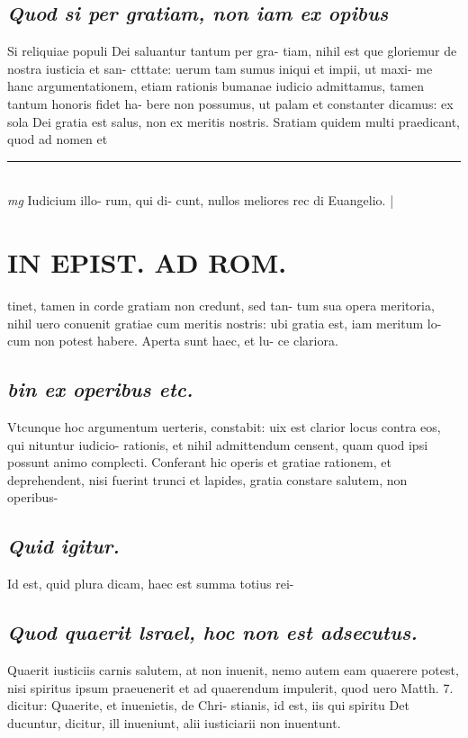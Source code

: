 \documentclass{article}
\begin{document}
\begin{pages}
\subsection*{\textit{Quod si per gratiam, non iam ex opibus }}\pstart Si reliquiae populi Dei saluantur tantum per gra- tiam, nihil est que gloriemur de nostra iusticia et san- ctttate: uerum tam sumus iniqui et impii, ut maxi- me hanc argumentationem, etiam rationis bumanae iudicio admittamus, tamen tantum honoris fidet ha- bere non possumus, ut palam et constanter dicamus: ex sola Dei gratia est salus, non ex meritis nostris. Sratiam quidem multi praedicant, quod ad nomen et  \pend
\vspace{0.5cm}\noindent
\vspace{0.2cm}\rule{1cm}{0.2pt}\\ 
\hspace{0.2cm}\textit{mg}
\footnotesize Iudicium illo- rum, qui di- cunt, nullos meliores rec di Euangelio. 
\normalsize| 
\section*{IN EPIST. AD ROM.  }
\marginpar{[ p.125 ]}\pstart tinet, tamen in corde gratiam non credunt, sed tan- tum sua opera meritoria, nihil uero conuenit gratiae cum meritis nostris: ubi gratia est, iam meritum lo- cum non potest habere. Aperta sunt haec, et lu- ce clariora.   \pend
{}
{}
\subsection*{\textit{bin ex operibus etc. }}\pstart Vtcunque hoc argumentum uerteris, constabit: uix est clarior locus contra eos, qui nituntur iudicio- rationis, et nihil admittendum censent, quam quod ipsi possunt animo complecti. Conferant hic operis et gratiae rationem, et deprehendent, nisi fuerint trunci et lapides, gratia constare salutem, non operibus-  \pend
{}
{}
\subsection*{\textit{Quid igitur. }}\pstart Id est, quid plura dicam, haec est summa totius rei-  \pend
{}
{}
\subsection*{\textit{Quod quaerit lsrael, hoc non est adsecutus. }}\pstart Quaerit iusticiis carnis salutem, at non inuenit, nemo autem eam quaerere potest, nisi spiritus ipsum praeuenerit et ad quaerendum impulerit, quod uero Matth. 7. dicitur: Quaerite, et inuenietis, de Chri- stianis, id est, iis qui spiritu Det ducuntur, dicitur, ill inueniunt, alii iusticiarii non inuentunt.   \pend
{}
{}

\end{pages}
\end{document}

